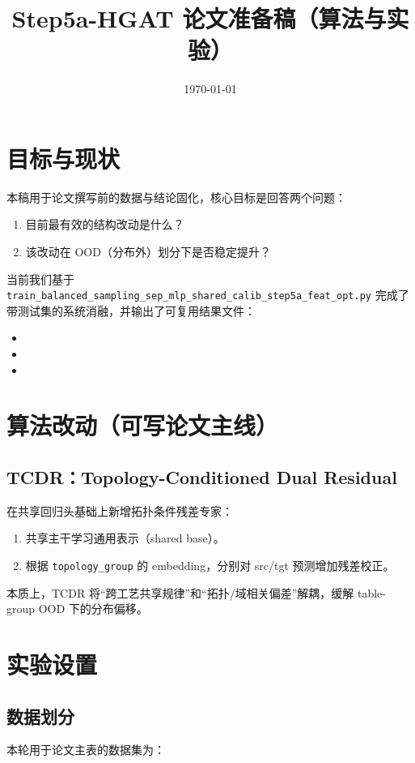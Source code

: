 \documentclass[12pt,a4paper]{ctexart}
\title{Step5a-HGAT 论文准备稿（算法与实验）}
\author{}
\date{\today}
\begin{document}
\maketitle

\section{目标与现状}
本稿用于论文撰写前的数据与结论固化，核心目标是回答两个问题：
\begin{enumerate}
  \item 目前最有效的结构改动是什么？
  \item 该改动在 OOD（分布外）划分下是否稳定提升？
\end{enumerate}

当前我们基于 \texttt{train\_balanced\_sampling\_sep\_mlp\_shared\_calib\_step5a\_feat\_opt.py}
完成了带测试集的系统消融，并输出了可复用结果文件：
\begin{itemize}
  \item {}
  \item {}
  \item {}
\end{itemize}

\section{算法改动（可写论文主线）}
\subsection{TCDR：Topology-Conditioned Dual Residual}
在共享回归头基础上新增拓扑条件残差专家：
\begin{enumerate}
  \item 共享主干学习通用表示（shared base）。
  \item 根据 \texttt{topology\_group} 的 embedding，分别对 src/tgt 预测增加残差校正。
\end{enumerate}

本质上，TCDR 将“跨工艺共享规律”和“拓扑/域相关偏差”解耦，缓解 table-group OOD 下的分布偏移。

\section{实验设置}
\subsection{数据划分}
本轮用于论文主表的数据集为：
\begin{center}
\end{center}
\end{document}

